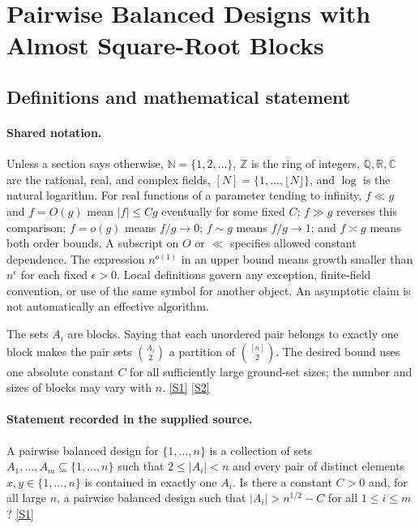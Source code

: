 \documentclass[11pt,a4paper]{article}
\newcommand{\N}{\mathbb{N}}
\newcommand{\Z}{\mathbb{Z}}
\newcommand{\Q}{\mathbb{Q}}
\newcommand{\R}{\mathbb{R}}
\newcommand{\C}{\mathbb{C}}
\newcommand{\sref}[2]{\hyperlink{source:#1:#2}{[S#2]}}
\begin{document}
\section{Pairwise Balanced Designs with Almost Square-Root Blocks}\label{statement}


\subsection{Definitions and mathematical statement}

\paragraph{Shared notation.}Unless a section says otherwise, $\N=\{1,2,\ldots\}$,
$\Z$ is the ring of integers, $\Q,\R,\C$ are the rational, real, and complex
fields, $[N]=\{1,\ldots,\lfloor N\rfloor\}$, and $\log$ is the natural
logarithm. For real functions of a parameter tending to infinity,
$f\ll g$ and $f=O(g)$ mean $|f|\leq Cg$ eventually for some fixed $C$;
$f\gg g$ reverses this comparison; $f=o(g)$ means $f/g\to0$;
$f\sim g$ means $f/g\to1$; and $f\asymp g$ means both order bounds.
A subscript on $O$ or $\ll$ specifies allowed constant dependence.
The expression $n^{o(1)}$ in an upper bound means growth smaller than
$n^\epsilon$ for each fixed $\epsilon>0$. Local definitions govern any
exception, finite-field convention, or use of the same symbol for another
object. An asymptotic claim is not automatically an effective algorithm.



The sets $A_i$ are blocks. Saying that each unordered pair belongs to exactly one block makes the pair sets $\binom{A_i}{2}$ a partition of $\binom{[n]}2$. The desired bound uses one absolute constant $C$ for all sufficiently large ground-set sizes; the number and sizes of blocks may vary with $n$. \sref{statement}{1} \sref{statement}{2}

\paragraph{Statement recorded in the supplied source.}
A pairwise balanced design for $\{1,\ldots,n\}$ is a collection of sets $A_1,\ldots,A_m\subseteq \{1,\ldots,n\}$ such that $2\leq \lvert A_i\rvert <n$ and every pair of distinct elements $x,y\in \{1,\ldots,n\}$ is contained in exactly one $A_i$.
Is there a constant $C>0$ and, for all large $n$, a pairwise balanced design such that $ \lvert A_i\rvert > n^{1/2}-C $ for all $1\leq i\leq m$? \sref{statement}{1}
\end{document}

